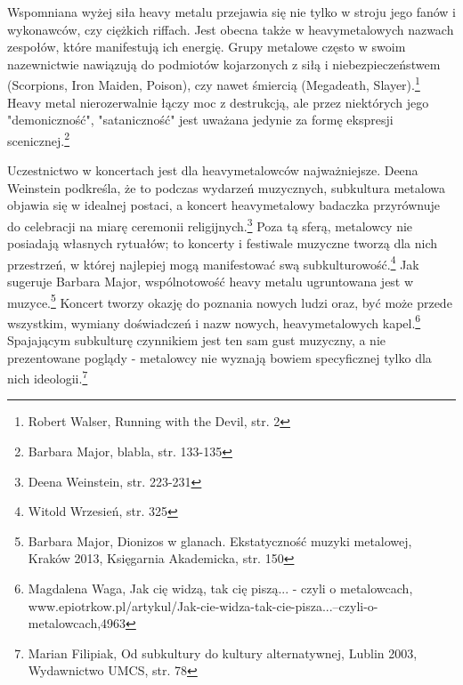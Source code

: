 \documentclass[12pt, a4paper, titlepage]{report}
\begin{document}
Wspomniana wyżej siła heavy metalu %
przejawia się nie tylko w stroju jego fanów i wykonawców, czy ciężkich riffach. Jest obecna także w heavymetalowych nazwach zespołów, które manifestują ich energię. Grupy metalowe często w swoim nazewnictwie nawiązują do podmiotów kojarzonych z siłą i niebezpieczeństwem (Scorpions, Iron Maiden, Poison), czy nawet śmiercią (Megadeath, Slayer).\footnote{Robert Walser, Running with the Devil, str. 2} Heavy metal nierozerwalnie łączy moc z destrukcją, ale przez niektórych jego "demoniczność", "sataniczność" jest uważana jedynie za formę ekspresji scenicznej.\footnote{Barbara Major, blabla, str. 133-135}

Uczestnictwo w koncertach jest dla heavymetalowców najważniejsze. Deena Weinstein podkreśla, że to podczas wydarzeń muzycznych, subkultura metalowa objawia się w idealnej postaci, a koncert heavymetalowy badaczka przyrównuje do celebracji na miarę ceremonii religijnych.\footnote{Deena Weinstein, str. 223-231} Poza tą sferą, metalowcy nie posiadają własnych rytuałów; to koncerty i festiwale muzyczne tworzą dla nich przestrzeń, w której najlepiej mogą manifestować swą subkulturowość.\footnote{Witold Wrzesień, str. 325} Jak sugeruje Barbara Major, wspólnotowość heavy metalu ugruntowana jest w muzyce.\footnote{Barbara Major, Dionizos w glanach. Ekstatyczność muzyki metalowej, Kraków 2013, Księgarnia Akademicka, str. 150} Koncert tworzy okazję do poznania nowych ludzi oraz, być może przede wszystkim, wymiany doświadczeń i nazw nowych, heavymetalowych kapel.\footnote{Magdalena Waga, Jak cię widzą, tak cię piszą... - czyli o metalowcach, www.epiotrkow.pl\break /artykul/Jak-cie-widza-tak-cie-pisza...--czyli-o-metalowcach,4963} Spajającym subkulturę czynnikiem jest ten sam gust muzyczny, a nie prezentowane poglądy - metalowcy nie wyznają bowiem specyficznej tylko dla nich ideologii.\footnote{Marian Filipiak, Od subkultury do kultury alternatywnej, Lublin 2003, Wydawnictwo UMCS, str. 78}
\end{document}
